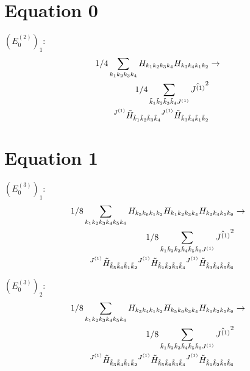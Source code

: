 \documentclass[11pt]{article}
\begin{document}
\section{Equation 0}
$\left({E^{(2)}_{0}}\right)_{1}$:
\begin{align}
1/4\sum_{{k}_{1}{k}_{2}{k}_{3}{k}_{4}}{H}_{{k}_{1}{k}_{2}{k}_{3}{k}_{4}}{H}_{{k}_{3}{k}_{4}{k}_{1}{k}_{2}}&\rightarrow \notag \\1/4\sum_{\tilde{k}_{1}\tilde{k}_{2}\tilde{k}_{3}\tilde{k}_{4}J^{(1)}}\hat{J^{(1)}}^{2}& \notag \\{}^{J^{(1)}}\tilde{H}_{\tilde{k}_{1}\tilde{k}_{2}\tilde{k}_{3}\tilde{k}_{4}}{}^{J^{(1)}}\tilde{H}_{\tilde{k}_{3}\tilde{k}_{4}\tilde{k}_{1}\tilde{k}_{2}}& \notag \\
\end{align}

\section{Equation 1}
$\left({E^{(3)}_{0}}\right)_{1}$:
\begin{align}
1/8\sum_{{k}_{1}{k}_{2}{k}_{3}{k}_{4}{k}_{5}{k}_{6}}{H}_{{k}_{5}{k}_{6}{k}_{1}{k}_{2}}{H}_{{k}_{1}{k}_{2}{k}_{3}{k}_{4}}{H}_{{k}_{3}{k}_{4}{k}_{5}{k}_{6}}&\rightarrow \notag \\1/8\sum_{\tilde{k}_{1}\tilde{k}_{2}\tilde{k}_{3}\tilde{k}_{4}\tilde{k}_{5}\tilde{k}_{6}J^{(1)}}\hat{J^{(1)}}^{2}& \notag \\{}^{J^{(1)}}\tilde{H}_{\tilde{k}_{5}\tilde{k}_{6}\tilde{k}_{1}\tilde{k}_{2}}{}^{J^{(1)}}\tilde{H}_{\tilde{k}_{1}\tilde{k}_{2}\tilde{k}_{3}\tilde{k}_{4}}{}^{J^{(1)}}\tilde{H}_{\tilde{k}_{3}\tilde{k}_{4}\tilde{k}_{5}\tilde{k}_{6}}& \notag \\
\end{align}

$\left({E^{(3)}_{0}}\right)_{2}$:
\begin{align}
1/8\sum_{{k}_{1}{k}_{2}{k}_{3}{k}_{4}{k}_{5}{k}_{6}}{H}_{{k}_{3}{k}_{4}{k}_{1}{k}_{2}}{H}_{{k}_{5}{k}_{6}{k}_{3}{k}_{4}}{H}_{{k}_{1}{k}_{2}{k}_{5}{k}_{6}}&\rightarrow \notag \\1/8\sum_{\tilde{k}_{1}\tilde{k}_{2}\tilde{k}_{3}\tilde{k}_{4}\tilde{k}_{5}\tilde{k}_{6}J^{(1)}}\hat{J^{(1)}}^{2}& \notag \\{}^{J^{(1)}}\tilde{H}_{\tilde{k}_{3}\tilde{k}_{4}\tilde{k}_{1}\tilde{k}_{2}}{}^{J^{(1)}}\tilde{H}_{\tilde{k}_{5}\tilde{k}_{6}\tilde{k}_{3}\tilde{k}_{4}}{}^{J^{(1)}}\tilde{H}_{\tilde{k}_{1}\tilde{k}_{2}\tilde{k}_{5}\tilde{k}_{6}}& \notag \\
\end{align}
\end{document}
